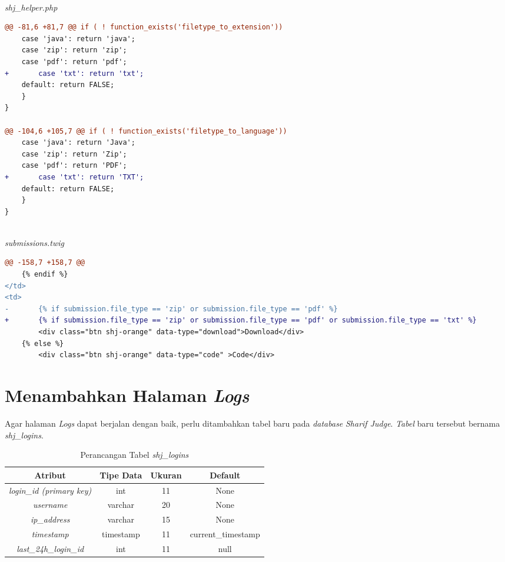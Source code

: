 ~\\
\textit{shj\_helper.php}
\begin{lstlisting}[language=diff, basicstyle=\ttfamily, frame=single,
columns=fullflexible, keepspaces=true, breaklines=true]
@@ -81,6 +81,7 @@ if ( ! function_exists('filetype_to_extension'))
	case 'java': return 'java';
	case 'zip': return 'zip';
	case 'pdf': return 'pdf';
+   	case 'txt': return 'txt';
	default: return FALSE;
	}
}

@@ -104,6 +105,7 @@ if ( ! function_exists('filetype_to_language'))
	case 'java': return 'Java';
	case 'zip': return 'Zip';
	case 'pdf': return 'PDF';
+   	case 'txt': return 'TXT';
	default: return FALSE;
	}
}
\end{lstlisting}
~\\
\textit{submissions.twig}
\begin{lstlisting}[language=diff, basicstyle=\ttfamily, frame=single,
columns=fullflexible, keepspaces=true, breaklines=true]
@@ -158,7 +158,7 @@
	{% endif %}
</td>
<td>
-   	{% if submission.file_type == 'zip' or submission.file_type == 'pdf' %}
+   	{% if submission.file_type == 'zip' or submission.file_type == 'pdf' or submission.file_type == 'txt' %}
		<div class="btn shj-orange" data-type="download">Download</div>
	{% else %}
		<div class="btn shj-orange" data-type="code" >Code</div>
\end{lstlisting}

\section{Menambahkan Halaman \textit{Logs}}%
\label{chap:logs}
Agar halaman \textit{Logs} dapat berjalan dengan baik, perlu ditambahkan tabel baru pada \textit{database} \textit{Sharif Judge}.  \textit{Tabel} baru tersebut bernama \textit{shj\_logins}. 
\begin{table}[H] %
	\centering 
	\caption{Perancangan Tabel \textit{shj\_logins}}
	\label{tab:tabellogs}
		\begin{tabular}{|c|c|c|c|}
			\hline
			\textbf{Atribut} & \textbf{Tipe Data} & \textbf{Ukuran}  & \textbf{Default} \\
			\hline
			\textit{login\_id (primary key)} & int & 11  & None \\
			\hline
			\textit{username} & varchar & 20  & None \\
			\hline
			\textit{ip\_address} & varchar & 15  & None \\
			\hline
			\textit{timestamp} & timestamp & 11  & current\_timestamp \\
			\hline
			\textit{last\_24h\_login\_id}	 & int & 11  & null \\
			\hline
		\end{tabular}
\end{table}


